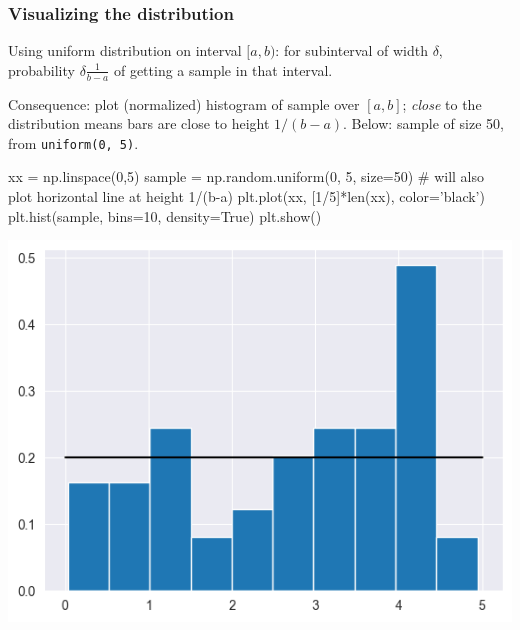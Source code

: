 \documentclass{beamer}
\newenvironment{codeblock}
    {\hfill\begin{beamerboxesrounded}[lower=codecol, width=0.8\textwidth]
    \medskip

    }
    { 
    \end{beamerboxesrounded}\hfill
    }
\theoremstyle{example}
\newcommand{\ttt}[1]{{\small\texttt{#1}}}
\begin{document}
\begin{frame}[fragile]
\frametitle{Visualizing the distribution}
Using uniform distribution on interval $[a,b)$: for subinterval of width $\delta$, probability $\delta\frac{1}{b-a}$ of getting a sample in that interval.

\pause
Consequence: plot (normalized) histogram of sample over $[a,b]$; \emph{close} to the distribution means bars are close to height $1/(b-a)$.\newline 
Below: sample of size 50, from \ttt{uniform(0, 5)}.

\begin{codeblock}

\begin{python}
xx = np.linspace(0,5)
sample = np.random.uniform(0, 5, size=50)
# will also plot horizontal line at height 1/(b-a)
plt.plot(xx, [1/5]*len(xx), color='black')
plt.hist(sample, bins=10, density=True)
plt.show()
\end{python}

\end{codeblock}

\pause
\centering
\includegraphics[height=0.35\textheight]{histogram_of_sample1.png}

\end{frame}
\end{document}
